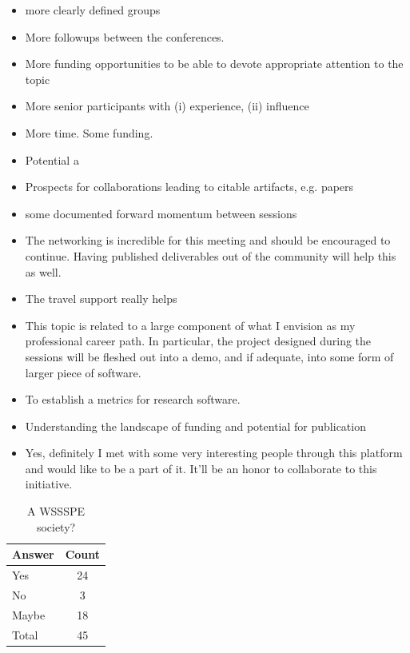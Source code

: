 \begin{itemize}
\item more clearly defined groups
\item More followups between the conferences.
\item More funding opportunities to be able to devote appropriate attention to the topic
\item More senior participants with (i) experience, (ii) influence
\item More time. Some funding.
\item Potential a
\item Prospects for collaborations leading to citable artifacts, e.g. papers
\item some documented forward momentum between sessions
\item The networking is incredible for this meeting and should be encouraged to continue. Having published deliverables out of the community will help this as well.
\item The travel support really helps
\item This topic is related to a large component of what I envision as my professional career path. In particular, the project designed during the sessions will be fleshed out into a demo, and if adequate, into some form of larger piece of software.
\item To establish a metrics for research software.
\item Understanding the landscape of funding and potential for publication
\item Yes, definitely I met with some very interesting people through this platform and would like to be a part of it. It'll be an honor to collaborate to this initiative.
\end{itemize}



\begin{table}[h!]
\centering
\caption{A WSSSPE society?}
\label{tab:survey_society}
\begin{tabular}{|l|c|}
\hline
{\bf Answer} &
{\bf Count} \\ \hline
Yes &
24 \\
No &
3 \\
Maybe &
18 \\
Total &
45 \\
\hline
\end{tabular}
\end{table}

